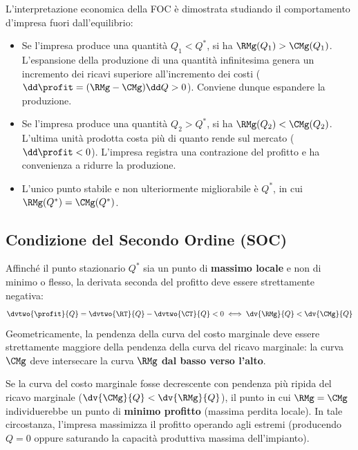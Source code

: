 \begin{osservazione}
L'interpretazione economica della FOC è dimostrata studiando il comportamento d'impresa fuori dall'equilibrio:
\begin{itemize}
    \item Se l'impresa produce una quantità $Q_1 < Q^*$, si ha $\RMg(Q_1) > \CMg(Q_1)$. L'espansione della produzione di una quantità infinitesima genera un incremento dei ricavi superiore all'incremento dei costi ($\dd \profit = (\RMg - \CMg)\dd Q > 0$). Conviene dunque espandere la produzione.
    \item Se l'impresa produce una quantità $Q_2 > Q^*$, si ha $\RMg(Q_2) < \CMg(Q_2)$. L'ultima unità prodotta costa più di quanto rende sul mercato ($\dd \profit < 0$). L'impresa registra una contrazione del profitto e ha convenienza a ridurre la produzione.
    \item L'unico punto stabile e non ulteriormente migliorabile è $Q^*$, in cui $\RMg(Q^*) = \CMg(Q^*)$.
\end{itemize}
\end{osservazione}

\subsection{Condizione del Secondo Ordine (SOC)}
Affinché il punto stazionario $Q^*$ sia un punto di \textbf{massimo locale} e non di minimo o flesso, la derivata seconda del profitto deve essere strettamente negativa:
\begin{equation}
    \dvtwo{\profit}{Q} = \dvtwo{\RT}{Q} - \dvtwo{\CT}{Q} < 0 \iff \dv{\RMg}{Q} < \dv{\CMg}{Q}
    \label{eq:soc_profitto}
\end{equation}
Geometricamente, la pendenza della curva del costo marginale deve essere strettamente maggiore della pendenza della curva del ricavo marginale: la curva $\CMg$ deve intersecare la curva $\RMg$ \textbf{dal basso verso l'alto}.

\begin{esame}
Se la curva del costo marginale fosse decrescente con pendenza più ripida del ricavo marginale ($\dv{\CMg}{Q} < \dv{\RMg}{Q}$), il punto in cui $\RMg = \CMg$ individuerebbe un punto di \textbf{minimo profitto} (massima perdita locale). In tale circostanza, l'impresa massimizza il profitto operando agli estremi (producendo $Q = 0$ oppure saturando la capacità produttiva massima dell'impianto).
\end{esame}

